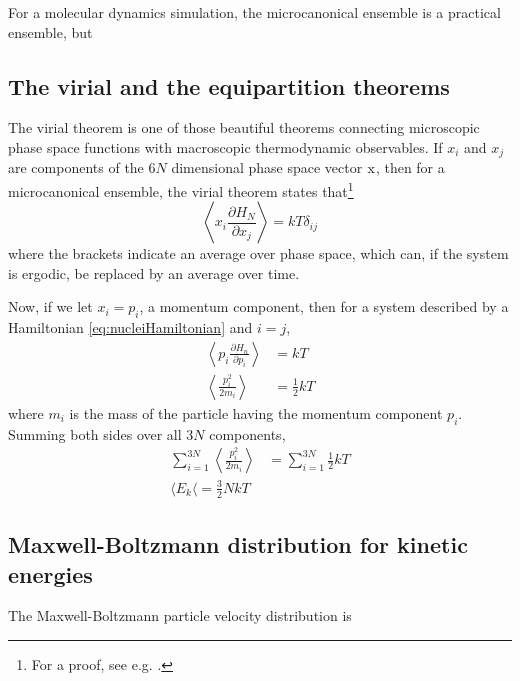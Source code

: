 \documentclass[11pt,bibliography=totoc,index=totoc]{scrbook}   %
\begin{document}
For a molecular dynamics simulation, the microcanonical ensemble is a practical ensemble, but  

%
\subsection{The virial and the equipartition theorems}
%

The virial theorem is one of those beautiful theorems connecting microscopic phase space functions with macroscopic thermodynamic observables. 
If $x_i$ and $x_j$ are components of the $6N$ dimensional phase space vector $\mathrm{x}$, 
then for a microcanonical ensemble, the virial theorem states that\footnote{For a proof, see e.g. \cite[81]{Tuckerman:2010}.}
\begin{equation}
  \left\langle x_i \frac{\partial H_N}{\partial x_j}\right\rangle = kT \delta_{ij}
\end{equation}
where the brackets indicate an average over phase space, which can, if the system is ergodic, be replaced by an average over time.

Now, if we let $x_i = p_i$, a momentum component, then for a system described by a Hamiltonian \eqref{eq:nucleiHamiltonian} and $i=j$,
\begin{align}
  \left\langle p_i \frac{\partial H_n}{\partial p_i}\right\rangle &= kT  \\
  \left\langle \frac{p_i^2}{2m_i}\right\rangle &= \frac12kT
\end{align}
where $m_i$ is the mass of the particle having the momentum component $p_i$. 
Summing both sides over all $3N$ components, 
\begin{align}
  \sum_{i=1}^{3N} \left\langle\frac{p_i^2}{2m_i} \right\rangle &= \sum_{i=1}^{3N} \frac12 kT \\
  \langle E_k \langle = \frac32 NkT
\end{align}




%
\subsection{Maxwell-Boltzmann distribution for kinetic energies}
%


The Maxwell-Boltzmann particle velocity distribution is
\end{document}
